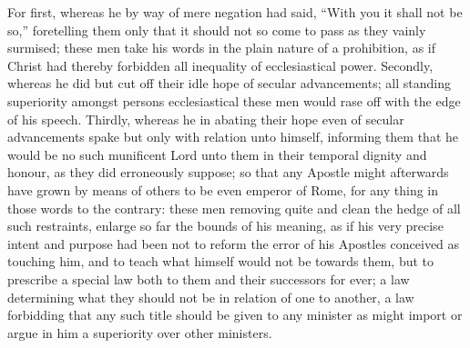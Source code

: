 For first, whereas he by way of mere negation had said, “With you it shall not be so,” foretelling them only that it should not so come to pass as they vainly surmised; these men take his words in the plain nature of a prohibition, as if Christ had thereby forbidden all inequality of ecclesiastical power. Secondly, whereas he did but cut off their idle hope of secular advancements; all standing superiority amongst persons ecclesiastical these men would rase off with the edge of his speech. Thirdly, whereas he in abating their hope even of secular advancements spake but only with relation unto himself, informing them that he would be no such munificent Lord unto them in their temporal dignity and honour, as they did erroneously suppose; so that any Apostle might afterwards have grown by means of others to be even emperor of Rome, for any thing in those words to the contrary: these men removing quite and clean the hedge of all such restraints, enlarge so far the bounds of his meaning, as if his very precise intent and purpose had been not to reform the error of his Apostles conceived as touching him, and to teach what himself would not be towards them, but to prescribe a special law both to them and their successors for ever; a law determining what they should not be in relation of one to another, a law forbidding that any such title should be given to any minister as might import or argue in him a superiority over other ministers.

